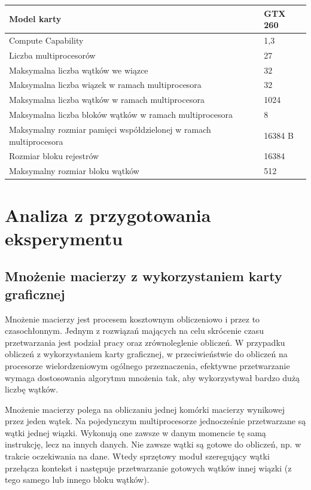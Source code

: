 \documentclass[12pt,a4paper]{article}
\begin{document}
\begin{table}[H]
\centering
\def\arraystretch{1.5}
\begin{tabular}{|l|l|}
\hline
Model karty & GTX 260 \\
\hline
Compute Capability & 1,3 \\
\hline
Liczba multiprocesorów & 27 \\
\hline
Maksymalna liczba wątków we wiązce & 32 \\
\hline
Maksymalna liczba wiązek w ramach multiprocesora & 32 \\
\hline
Maksymalna liczba wątków w ramach multiprocesora & 1024 \\
\hline
Maksymalna liczba bloków wątków w ramach multiprocesora & 8 \\
\hline
Maksymalny rozmiar pamięci współdzielonej w ramach multiprocesora & 16384 B \\
\hline
Rozmiar bloku rejestrów & 16384 \\
\hline
Maksymalny rozmiar bloku wątków & 512 \\
\hline
\end{tabular}
\end{table}

\section{Analiza z przygotowania eksperymentu}

\subsection{Mnożenie macierzy z wykorzystaniem karty graficznej}

Mnożenie macierzy jest procesem kosztownym obliczeniowo i przez to czasochłonnym. Jednym z rozwiązań mających na celu skrócenie czasu przetwarzania jest podział pracy oraz zrównoleglenie obliczeń. W przypadku obliczeń z wykorzystaniem karty graficznej, w przeciwieństwie do obliczeń na procesorze wielordzeniowym ogólnego przeznaczenia, efektywne przetwarzanie wymaga dostosowania algorytmu mnożenia tak, aby wykorzystywał bardzo dużą liczbę wątków.

Mnożenie macierzy polega na obliczaniu jednej komórki macierzy wynikowej przez jeden wątek. Na pojedynczym multiprocesorze jednocześnie przetwarzane są wątki jednej wiązki. Wykonują one zawsze w danym momencie tę samą instrukcję, lecz na innych danych. Nie zawsze wątki są gotowe do obliczeń, np. w trakcie oczekiwania na dane. Wtedy sprzętowy moduł szeregujący wątki przełącza kontekst i następuje przetwarzanie gotowych wątków innej wiązki (z tego samego lub innego bloku wątków).
\end{document}
